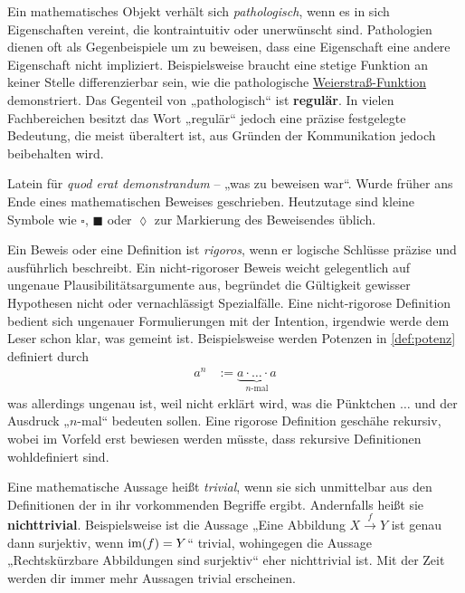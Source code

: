 \begin{description}[labelindent=0pt, leftmargin=0pt]
    \item[Pathologisch:] Ein mathematisches Objekt verhält sich \emph{pathologisch}, wenn es in sich Eigenschaften vereint, die kontraintuitiv oder unerwünscht sind. Pathologien dienen oft als Gegenbeispiele um zu beweisen, dass eine Eigenschaft eine andere Eigenschaft nicht impliziert. Beispielsweise braucht eine stetige Funktion an keiner Stelle differenzierbar sein, wie die pathologische \href{https://de.wikipedia.org/wiki/Weierstrass-Funktion}{Weierstraß-Funktion} demonstriert. Das Gegenteil von „pathologisch“ ist \textbf{regulär}. In vielen Fachbereichen besitzt das Wort „regulär“ jedoch eine präzise festgelegte Bedeutung, die meist überaltert ist, aus Gründen der Kommunikation jedoch beibehalten wird.

    \item[QED:] Latein für \emph{quod erat demonstrandum} -- „was zu beweisen war“. Wurde früher ans Ende eines mathematischen Beweises geschrieben. Heutzutage sind kleine Symbole wie $\square$, $\blacksquare$ oder $\lozenge$ zur Markierung des Beweisendes üblich.

    \item[Rigoros:] Ein Beweis oder eine Definition ist \emph{rigoros}, wenn er logische Schlüsse präzise und ausführlich beschreibt. Ein nicht-rigoroser Beweis weicht gelegentlich auf ungenaue Plausibilitätsargumente aus, begründet die Gültigkeit gewisser Hypothesen nicht oder vernachlässigt Spezialfälle. Eine nicht-rigorose Definition bedient sich ungenauer Formulierungen mit der Intention, irgendwie werde dem Leser schon klar, was gemeint ist. Beispielsweise werden Potenzen in \cref{def:potenz} definiert durch
    \begin{align*}
        a^n & := \underbrace{a \cdot \ldots \cdot a}_{n\text{-mal}}
    \end{align*}
    was allerdings ungenau ist, weil nicht erklärt wird, was die Pünktchen $\dots$ und der Ausdruck „$n$-mal“ bedeuten sollen. Eine rigorose Definition geschähe rekursiv, wobei im Vorfeld erst bewiesen werden müsste, dass rekursive Definitionen wohldefiniert sind.

    \item[Trivial:] Eine mathematische Aussage heißt \emph{trivial}, wenn sie sich unmittelbar aus den Definitionen der in ihr vorkommenden Begriffe ergibt. Andernfalls heißt sie \textbf{nichttrivial}. Beispielsweise ist die Aussage „Eine Abbildung $X\xrightarrow{f} Y$ ist genau dann surjektiv, wenn $\operatorname{im}(f)=Y$“ trivial, wohingegen die Aussage „Rechtskürzbare Abbildungen sind surjektiv“ eher nichttrivial ist. Mit der Zeit werden dir immer mehr Aussagen trivial erscheinen.


\end{description}

